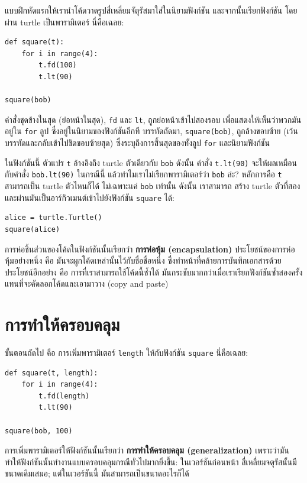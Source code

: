 แบบฝึกหัดแรกให้เรานำโค้ดวาดรูปสี่เหลี่ยมจัตุรัสมาใส่ในนิยามฟังก์ชัน และจากนั้นเรียกฟังก์ชัน
โดยผ่าน turtle เป็นพารามิเตอร์  นี่คือเฉลย:

\begin{verbatim}
def square(t):
    for i in range(4):
        t.fd(100)
        t.lt(90)

square(bob)
\end{verbatim}
%
คำสั่งชุดข้างในสุด (ย่อหน้าในสุด), {\tt fd} และ {\tt lt}, ถูกย่อหน้าเข้าไปสองรอบ 
เพื่อแสดงให้เห็นว่าพวกมันอยู่ใน {\tt for} ลูป 
ซึ่งอยู่ในนิยามของฟังก์ชันอีกที
บรรทัดถัดมา, {\tt square(bob)}, ถูกล้างขอบซ้าย (เว้นบรรทัดและกลับเข้าไปชิดขอบซ้ายสุด)
ซึ่งระบุถึงการสิ้นสุดของทั้งลูป {\tt for} และนิยามฟังก์ชัน

ในฟังก์ชันนี้ ตัวแปร {\tt t} อ้างอิงถึง turtle ตัวเดียวกับ {\tt bob}  ดังนั้น คำสั่ง {\tt t.lt(90)}
จะให้ผลเหมือนกับคำสั่ง {\tt bob.lt(90)}  ในกรณีนี้ แล้วทำไมเราไม่เรียกพารามิเตอร์ว่า {\tt bob} ล่ะ?
หลักการคือ {\tt t} สามารถเป็น turtle ตัวไหนก็ได้ ไม่เฉพาะแค่ {\tt bob} เท่านั้น  ดังนั้น เราสามารถ
สร้าง turtle ตัวที่สอง และผ่านมันเป็นอาร์กิวเมนต์เข้าไปยังฟังก์ชัน {\tt square} ได้:

\begin{verbatim}
alice = turtle.Turtle()
square(alice)
\end{verbatim}
%
การห่อชิ้นส่วนของโค้ดในฟังก์ชันนั้นเรียกว่า {\bf การห่อหุ้ม (encapsulation)}
ประโยชน์ของการห่อหุ้มอย่างหนึ่ง คือ มันจะผูกโค้ดเหล่านั้นไว้กับชื่อชื่อหนึ่ง ซึ่งทำหน้าที่คล้ายการบันทึกเอกสารด้วย
ประโยชน์อีกอย่าง คือ การที่เราสามารถใช้โค้ดนี้ซ้ำได้ มันกระชับมากกว่าเมื่อเราเรียกฟังก์ชันซ้ำสองครั้ง 
แทนที่จะคัดลอกโค้ดและเอามาวาง (copy and paste)


\section{การทำให้ครอบคลุม} %

ขั้นตอนถัดไป คือ การเพิ่มพารามิเตอร์ {\tt length} ให้กับฟังก์ชัน {\tt square} 
นี่คือเฉลย:

\begin{verbatim}
def square(t, length):
    for i in range(4):
        t.fd(length)
        t.lt(90)

square(bob, 100)
\end{verbatim}
%
การเพิ่มพารามิเตอร์ให้ฟังก์ชันนั้นเรียกว่า {\bf การทำให้ครอบคลุม (generalization)}
เพราะว่ามันทำให้ฟังก์ชันนั้นทำงานแบบครอบคลุมกรณีทั่วไปมากยิ่งขึ้น: ในเวอร์ชันก่อนหน้า 
สี่เหลี่ยมจตุรัสนั้นมีขนาดเดิมเสมอ; แต่ในเวอร์ชันนี้ มันสามารถเป็นขนาดอะไรก็ได้

